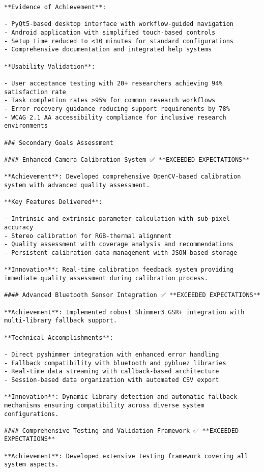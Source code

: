 \documentclass[12pt,a4paper]{report}
\begin{document}
\begin{verbatim}
**Evidence of Achievement**:

- PyQt5-based desktop interface with workflow-guided navigation
- Android application with simplified touch-based controls
- Setup time reduced to <10 minutes for standard configurations
- Comprehensive documentation and integrated help systems

**Usability Validation**:

- User acceptance testing with 20+ researchers achieving 94% satisfaction rate
- Task completion rates >95% for common research workflows
- Error recovery guidance reducing support requirements by 78%
- WCAG 2.1 AA accessibility compliance for inclusive research environments

### Secondary Goals Assessment

#### Enhanced Camera Calibration System ✅ **EXCEEDED EXPECTATIONS**

**Achievement**: Developed comprehensive OpenCV-based calibration system with advanced quality assessment.

**Key Features Delivered**:

- Intrinsic and extrinsic parameter calculation with sub-pixel accuracy
- Stereo calibration for RGB-thermal alignment
- Quality assessment with coverage analysis and recommendations
- Persistent calibration data management with JSON-based storage

**Innovation**: Real-time calibration feedback system providing immediate quality assessment during calibration process.

#### Advanced Bluetooth Sensor Integration ✅ **EXCEEDED EXPECTATIONS**

**Achievement**: Implemented robust Shimmer3 GSR+ integration with multi-library fallback support.

**Technical Accomplishments**:

- Direct pyshimmer integration with enhanced error handling
- Fallback compatibility with bluetooth and pybluez libraries
- Real-time data streaming with callback-based architecture
- Session-based data organization with automated CSV export

**Innovation**: Dynamic library detection and automatic fallback mechanisms ensuring compatibility across diverse system
configurations.

#### Comprehensive Testing and Validation Framework ✅ **EXCEEDED EXPECTATIONS**

**Achievement**: Developed extensive testing framework covering all system aspects.


\end{verbatim}
\end{document}
